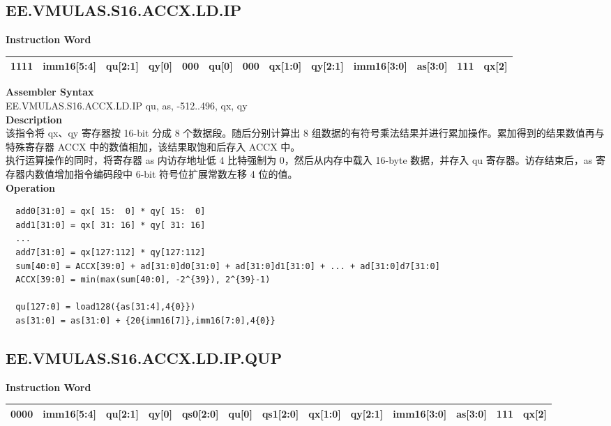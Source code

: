 \clearpage
\subsection{EE.VMULAS.S16.ACCX.LD.IP}\label{instruction:EEVMULASS16ACCXLDIP}
\setlength\tabcolsep{6pt}
\textbf{Instruction Word} \\
\begin{tabular}{|c|c|c|c|c|c|c|c|c|c|c|c|c|}
	\hline
	1111 & imm16[5:4] & qu[2:1] & qy[0] & 000 & qu[0] & 000 & qx[1:0] & qy[2:1] & imm16[3:0] & as[3:0] & 111 & qx[2] \\
	\hline
\end{tabular}

\textbf{Assembler Syntax} \\
EE.VMULAS.S16.ACCX.LD.IP qu, as, -512..496, qx, qy \\
\textbf{Description} \\
该指令将 qx、qy 寄存器按 16-bit 分成 8 个数据段。随后分别计算出 8 组数据的有符号乘法结果并进行累加操作。累加得到的结果数值再与特殊寄存器 ACCX 中的数值相加，该结果取饱和后存入 ACCX 中。\\ 执行运算操作的同时，将寄存器 as 内访存地址低 4 比特强制为 0，然后从内存中载入 16-byte 数据，并存入 qu 寄存器。访存结束后，as 寄存器内数值增加指令编码段中 6-bit 符号位扩展常数左移 4 位的值。\\
\textbf{Operation}
\begin{lstlisting}
  add0[31:0] = qx[ 15:  0] * qy[ 15:  0]
  add1[31:0] = qx[ 31: 16] * qy[ 31: 16]
  ...
  add7[31:0] = qx[127:112] * qy[127:112]
  sum[40:0] = ACCX[39:0] + ad[31:0]d0[31:0] + ad[31:0]d1[31:0] + ... + ad[31:0]d7[31:0]
  ACCX[39:0] = min(max(sum[40:0], -2^{39}), 2^{39}-1)

  qu[127:0] = load128({as[31:4],4{0}})
  as[31:0] = as[31:0] + {20{imm16[7]},imm16[7:0],4{0}}
\end{lstlisting}

\clearpage
\subsection{EE.VMULAS.S16.ACCX.LD.IP.QUP}\label{instruction:EEVMULASS16ACCXLDIPQUP}
\setlength\tabcolsep{5pt}
\textbf{Instruction Word} \\
\begin{tabular}{|c|c|c|c|c|c|c|c|c|c|c|c|c|}
	\hline
	0000 & imm16[5:4] & qu[2:1] & qy[0] & qs0[2:0] & qu[0] & qs1[2:0] & qx[1:0] & qy[2:1] & imm16[3:0] & as[3:0] & 111 & qx[2] \\
	\hline
\end{tabular}

